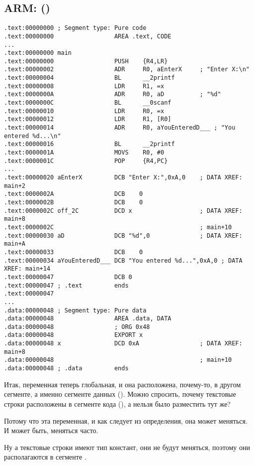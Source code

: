 \subsection{ARM: \OptimizingKeilVI (\ThumbMode)}

\begin{lstlisting}
.text:00000000 ; Segment type: Pure code
.text:00000000                 AREA .text, CODE
...
.text:00000000 main
.text:00000000                 PUSH    {R4,LR}
.text:00000002                 ADR     R0, aEnterX     ; "Enter X:\n"
.text:00000004                 BL      __2printf
.text:00000008                 LDR     R1, =x
.text:0000000A                 ADR     R0, aD          ; "%d"
.text:0000000C                 BL      __0scanf
.text:00000010                 LDR     R0, =x
.text:00000012                 LDR     R1, [R0]
.text:00000014                 ADR     R0, aYouEnteredD___ ; "You entered %d...\n"
.text:00000016                 BL      __2printf
.text:0000001A                 MOVS    R0, #0
.text:0000001C                 POP     {R4,PC}
...
.text:00000020 aEnterX         DCB "Enter X:",0xA,0    ; DATA XREF: main+2
.text:0000002A                 DCB    0
.text:0000002B                 DCB    0
.text:0000002C off_2C          DCD x                   ; DATA XREF: main+8
.text:0000002C                                         ; main+10
.text:00000030 aD              DCB "%d",0              ; DATA XREF: main+A
.text:00000033                 DCB    0
.text:00000034 aYouEnteredD___ DCB "You entered %d...",0xA,0 ; DATA XREF: main+14
.text:00000047                 DCB 0
.text:00000047 ; .text         ends
.text:00000047
...
.data:00000048 ; Segment type: Pure data
.data:00000048                 AREA .data, DATA
.data:00000048                 ; ORG 0x48
.data:00000048                 EXPORT x
.data:00000048 x               DCD 0xA                 ; DATA XREF: main+8
.data:00000048                                         ; main+10
.data:00000048 ; .data         ends
\end{lstlisting}

Итак, переменная  теперь глобальная, и она расположена, почему-то, в другом сегменте, а именно сегменте данных ().
Можно спросить, почему текстовые строки расположены в сегменте кода (), а  нельзя было разместить тут же?

Потому что эта переменная, и как следует из определения, она может меняться. И может быть, меняться часто.

Ну а текстовые строки имеют тип констант, они не будут меняться, поэтому они располагаются в сегменте .

